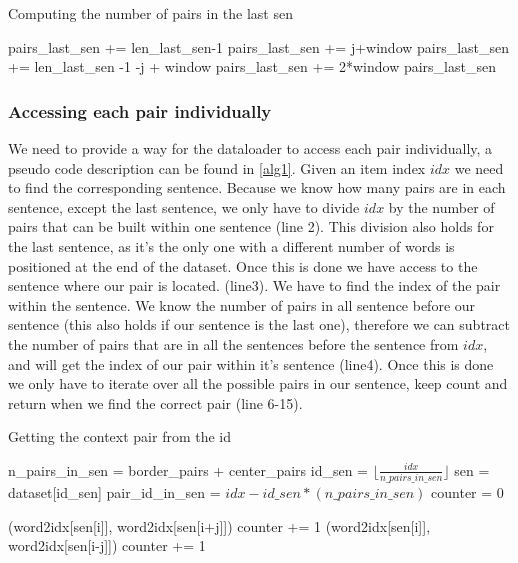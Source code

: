 \begin{algorithm}[h]
\caption{Computing the number of pairs in the last sen}
\label{alg2}
\begin{algorithmic}[1]
\STATE pairs\_last\_sen += len\_last\_sen-1
\ELSE
\STATE pairs\_last\_sen += j+window
\ENDIF
{}
\STATE pairs\_last\_sen += len\_last\_sen -1 -j + window
\ELSE
\STATE pairs\_last\_sen += 2*window
\ENDIF
\ENDFOR
\RETURN pairs\_last\_sen
\end{algorithmic}
\end{algorithm}

 \subsubsection{Accessing each pair individually}
We need to provide a way for the dataloader to access each pair individually, a pseudo code description can be found in \ref{alg1}. 
Given an item index $idx$ we need to find the corresponding sentence. Because we know how many pairs  are in each sentence, except the last sentence, we only have to divide $idx$ by the number of pairs that can be built within one sentence (line 2). This division also holds for the last sentence, as it's the only one with a different number of words is positioned at the end of the dataset. Once this is done we have access to the sentence where our pair is located. (line3). We have to find the index of the pair within the sentence. We know the number of pairs in all sentence before our sentence (this also holds if our sentence is the last one), therefore we can subtract the number of pairs that are in all the sentences before the sentence from $idx$, and will get the index of our pair within it's sentence (line4). Once this is done we only have to iterate over all the possible pairs in our sentence, keep count and return when we find the correct pair (line 6-15).
\begin{algorithm}
\caption{Getting the context pair from the id}
\label{alg1}
\begin{algorithmic}[1]

\STATE n\_pairs\_in\_sen = border\_pairs + center\_pairs
 \STATE id\_sen = $\lfloor \frac{idx}{n\_pairs\_in\_sen} \rfloor$
\STATE  sen  = dataset[id\_sen]
\STATE  pair\_id\_in\_sen = $idx - id\_sen*(n\_pairs\_in\_sen)$
\STATE counter = 0

\RETURN (word2idx[sen[i]], word2idx[sen[i+j]])
\ENDIF
\STATE counter += 1
\ENDIF
{}
\RETURN (word2idx[sen[i]], word2idx[sen[i-j]])
\ENDIF
\STATE counter += 1
\ENDIF
\ENDFOR
\ENDFOR
\end{algorithmic}
\end{algorithm}

